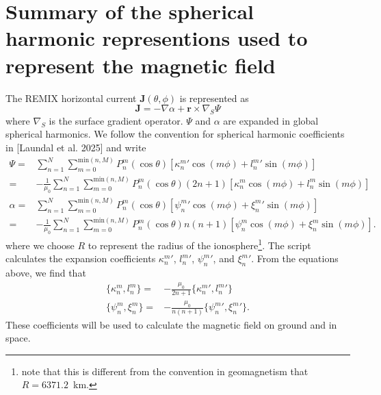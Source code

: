 \documentclass[]{article}
\begin{document}
\begin{abstract}
Document to describe how the magnetic field is calculated
\end{abstract}

\section*{Summary of the spherical harmonic representions used to represent the magnetic field}
The REMIX horizontal current $\mathbf{J}(\theta, \phi)$ is represented as
\begin{equation}
\mathbf{J} = -\nabla \alpha + \mathbf{r}\times \nabla_S \Psi
\end{equation}
where $\nabla_S$ is the surface gradient operator. $\Psi$ and $\alpha$ are expanded in global spherical harmonics. We follow the convention for spherical harmonic coefficients in [Laundal et al. 2025] and write
\begin{align}
\Psi   = & \sum_{n = 1}^{N}\sum_{m = 0}^{\mathrm{min}(n, M)} P_n^m(\cos\theta)[\kappa_n^m'\cos(m\phi) + l_n^m'\sin(m\phi)] \nonumber \\
=& -\frac{1}{\mu_0}\sum_{n = 1}^{N}\sum_{m = 0}^{\mathrm{min}(n, M)} P_n^m(\cos\theta)(2n+1)[\kappa_n^m\cos(m\phi) + l_n^m \sin(m\phi)] \\
\alpha = & \sum_{n = 1}^{N}\sum_{m = 0}^{\mathrm{min}(n, M)} P_n^m(\cos\theta)[\psi_n^m'\cos(m\phi) + \xi_n^m' \sin(m\phi)] \nonumber \\
=& -\frac{1}{\mu_0}\sum_{n = 1}^{N}\sum_{m = 0}^{\mathrm{min}(n, M)} P_n^m(\cos\theta)n(n+1)[\psi_n^m\cos(m\phi) + \xi_n^m \sin(m\phi)].
\end{align}
where we choose $R$ to represent the radius of the ionosphere\footnote{note that this is different from the convention in geomagnetism that $R=6371.2$~km.}. The script  calculates the expansion coefficients $\kappa_n^m'$, $l_n^m'$, $\psi_n^m'$, and $\xi_n^m'$. From the equations above, we find that
\begin{align}
\{\kappa_n^m, l_n^m\} =& -\frac{\mu_0}{2n + 1}\{\kappa_n^m', l_n^m'\} \\
\{\psi_n^m, \xi_n^m\} =& -\frac{\mu_0}{n(n+1)}\{\psi_n^m', \xi_n^m'\}.
\end{align}
These coefficients will be used to calculate the magnetic field on ground and in space.
\end{document}
